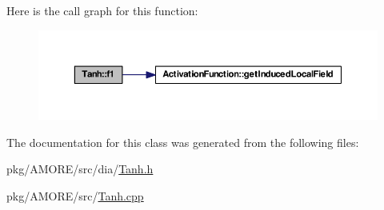 Here is the call graph for this function:\nopagebreak
\begin{figure}[H]
\begin{center}
\leavevmode
\includegraphics[width=378pt]{class_tanh_af723894488a3c1adb7dcdefbcc4b360a_cgraph}
\end{center}
\end{figure}




The documentation for this class was generated from the following files:\begin{DoxyCompactItemize}
\item 
pkg/AMORE/src/dia/\hyperlink{_tanh_8h}{Tanh.h}\item 
pkg/AMORE/src/\hyperlink{_tanh_8cpp}{Tanh.cpp}\end{DoxyCompactItemize}
